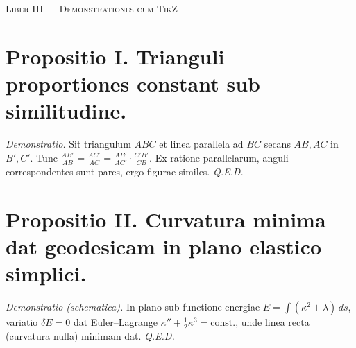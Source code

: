 \documentclass[12pt]{article}
\newcommand{\dingir}{\centerline{\Large \ornament{𒀭}}}
\newcommand{\divider}{\vspace{1em}\dingir\vspace{1em}}
\newcommand{\Liber}[1]{\vspace{1ex}\begin{center}\Large\textsc{Liber #1}\end{center}\vspace{-0.5ex}\dingir\vspace{0.5ex}}
\begin{document}
\divider

\Liber{III — Demonstrationes cum TikZ}

\section*{Propositio I. \; Trianguli proportiones constant sub similitudine.}

\textit{Demonstratio.} Sit triangulum $ABC$ et linea parallela ad $BC$ secans $AB, AC$ in $B', C'$. Tunc $\frac{AB'}{AB}=\frac{AC'}{AC}=\frac{A B'}{A C'}\cdot\frac{C'B'}{CB}$. Ex ratione parallelarum, anguli correspondentes sunt pares, ergo figurae similes. \textit{Q.E.D.}

\begin{center}
\end{center}

\section*{Propositio II. \; Curvatura minima dat geodesicam in plano elastico simplici.}

\textit{Demonstratio (schematica).} In plano sub functione energiae $E=\int (\kappa^2 + \lambda)\,ds$, variatio $\delta E=0$ dat Euler–Lagrange $\kappa''+\tfrac12\kappa^3=\text{const.}$, unde linea recta (curvatura nulla) minimam dat. \textit{Q.E.D.}

\begin{center}
\end{center}

\divider
\end{document}
